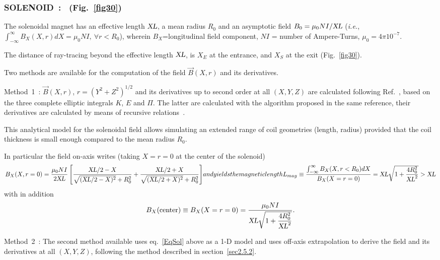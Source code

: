 \newpage

\subsubsection*{SOLENOID~: \SOLENOIDTitl\ (Fig.~\protect\ref{fig30}) } \label{SOLENOID}  
\medskip 

 The solenoidal magnet has an effective length $ \textsl{XL}$,  a mean radius
$ R_0 $ and an asymptotic field  $ B_0=\mu_0 N I / \textsl{XL}$ (\emph{i.e.}, $\int_{-\infty}^\infty 
B_X(X,r) dX = \mu_0 N I, ~\forall r<R_0$), wherein $B_X$=longitudinal field component, 
$ NI $  = number of Ampere-Turns, $\mu_0=4\pi  10^{-7} $. 
\medskip

\noindent The distance of ray-tracing beyond the effective length $ \textsl{XL}$,   is 
$X_E $ at the entrance, and $ X_S $ at the exit (Fig.~\ref{fig30}).   
\medskip

\noindent Two methods are available for the computation of the field $ \vec  B(X,r)$ and its derivatives. 


\noindent Method~1~:   $ \vec  B(X,r)$, $r=(Y^2+Z^2)^{1/2} $ and its derivatives up to 
second order  at all $(X,Y,Z)$ are calculated following Ref.~\cite{Biblio17}, %
based on the three complete elliptic integrals $K$, $E $ and $\Pi$. The latter 
are calculated with the algorithm proposed in the same reference, their
derivatives are calculated by means of recursive relations~\cite{Biblio18}.  %

\medskip

\noindent This analytical model for the solenoidal field allows simulating an 
extended range of coil geometries (length, radius) 
provided that the coil thickness is small enough compared to the mean radius $ R_0 $. 
\medskip


\noindent In particular the field on-axis writes (taking $X=r=0$ at the center of the  solenoid) 
\begin{equation}
B_X(X,r=0) = \dfrac{\mu_0 N I }{2 \XL} \left[ \dfrac{\XL/2-X}{\sqrt{(\XL/2-X)^2}+R_0^2} 
+  \dfrac{\XL/2+X}{\sqrt{(\XL/2+X)^2}+R_0^2} \right]$$ 
 and yields the magnetic length 
$$L_{mag} \equiv  \dfrac{\int_{-\infty}^\infty B_X(X,r<R_0) dX }{B_X(X=r=0)} 
= \XL\sqrt{1+\dfrac{4R_0^2 }{\XL^2}} > \XL 
\label{EqSol}
\end{equation}
with in addition 
$$B_X(\textrm{center}) \equiv B_X(X=r=0) = 
      \dfrac{\mu_0 N I }{\textsl{XL}\sqrt{1+\dfrac{4R_0^2}{\textsl{XL}^2}}}.$$

\bigskip

\noindent Method~2~:  The second method available uses eq.~\ref{EqSol} above as a 1-D model and uses off-axis 
extrapolation to derive the field  and its derivatives at all $(X,Y,Z)$, following the method 
described in section~\ref{sec2.5.2}. 


